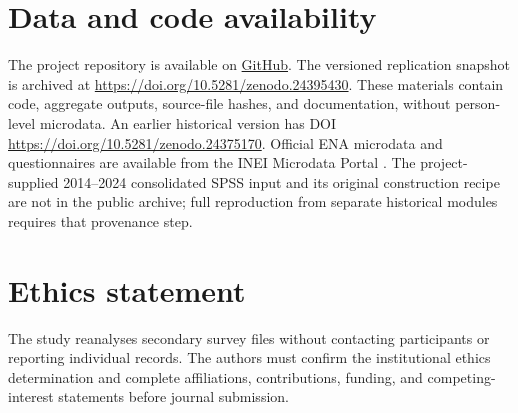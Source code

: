 \documentclass[11pt,a4paper]{article}
\begin{document}
\section*{Data and code availability}
The project repository is available on \href{https://github.com/rntvargas/Gendered-Agricultural-Headship-in-Peru-2014-2025}{GitHub}. The versioned replication snapshot is archived at \url{https://doi.org/10.5281/zenodo.24395430}. These materials contain code, aggregate outputs, source-file hashes, and documentation, without person-level microdata. An earlier historical version has DOI \url{https://doi.org/10.5281/zenodo.24375170}. Official ENA microdata and questionnaires are available from the INEI Microdata Portal \cite{ineiportal}. The project-supplied 2014--2024 consolidated SPSS input and its original construction recipe are not in the public archive; full reproduction from separate historical modules requires that provenance step.

\section*{Ethics statement}
The study reanalyses secondary survey files without contacting participants or reporting individual records. The authors must confirm the institutional ethics determination and complete affiliations, contributions, funding, and competing-interest statements before journal submission.
\end{document}
